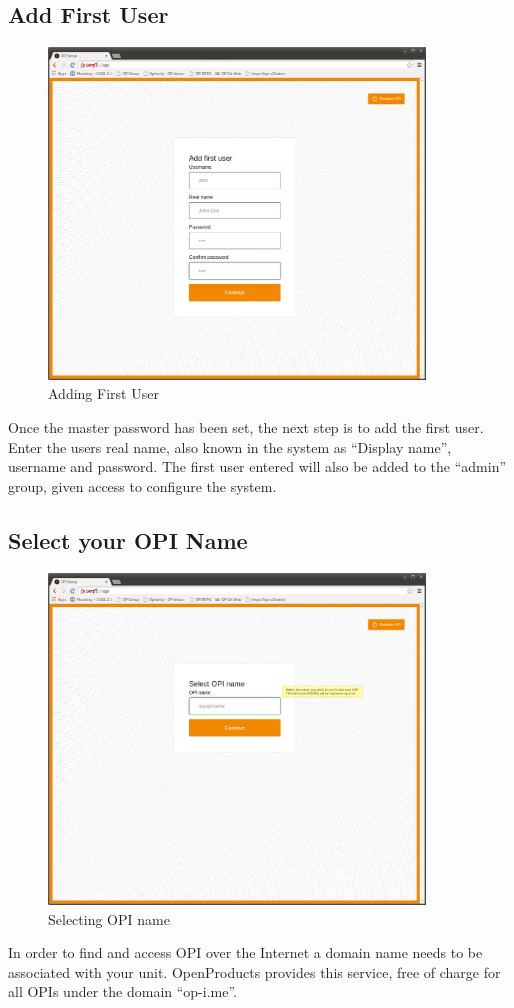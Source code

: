 \documentclass[12pt,a4paper,titlepage]{article}
\begin{document}
\newpage
\subsection{Add First User}
\begin{figure}[h]
\centering
\includegraphics[width=10cm]{./img/first_user}
\caption{Adding First User}
\end{figure}
Once the master password has been set, the next step is to add the first user. Enter the users real name, also known in the system as ``Display name'', username and password. The first user entered will also be added to the ``admin'' group, given access to configure the system.
\newpage
\subsection{Select your OPI Name}
\begin{figure}[h]
\centering
\includegraphics[width=10cm]{./img/opiname}
\caption{Selecting OPI name}
\end{figure}
In order to find and access OPI over the Internet a domain name needs to be associated with your unit. OpenProducts provides this service, free of charge for all OPIs under the domain “op-i.me”.
\end{document}
